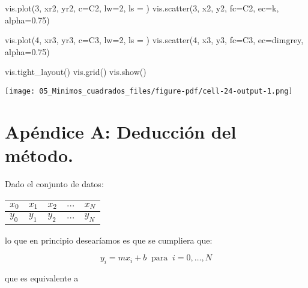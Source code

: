 \documentclass[
  letterpaper,
  DIV=11,
  numbers=noendperiod]{scrreprt}
\newenvironment{Shaded}{\begin{snugshade}}{\end{snugshade}}
\newcommand{\DecValTok}[1]{\textcolor[rgb]{0.68,0.00,0.00}{#1}}
\newcommand{\FloatTok}[1]{\textcolor[rgb]{0.68,0.00,0.00}{#1}}
\newcommand{\NormalTok}[1]{\textcolor[rgb]{0.00,0.23,0.31}{#1}}
\newcommand{\OperatorTok}[1]{\textcolor[rgb]{0.37,0.37,0.37}{#1}}
\newcommand{\StringTok}[1]{\textcolor[rgb]{0.13,0.47,0.30}{#1}}
\begin{document}
\begin{Shaded}
\begin{Highlighting}[]
\NormalTok{vis.plot(}\DecValTok{3}\NormalTok{, xr2, yr2, c}\OperatorTok{=}\StringTok{\textquotesingle{}C2\textquotesingle{}}\NormalTok{, lw}\OperatorTok{=}\DecValTok{2}\NormalTok{, ls }\OperatorTok{=} \StringTok{\textquotesingle{}{-}{-}\textquotesingle{}}\NormalTok{)}
\NormalTok{vis.scatter(}\DecValTok{3}\NormalTok{, x2, y2, fc}\OperatorTok{=}\StringTok{\textquotesingle{}C2\textquotesingle{}}\NormalTok{, ec}\OperatorTok{=}\StringTok{\textquotesingle{}k\textquotesingle{}}\NormalTok{, alpha}\OperatorTok{=}\FloatTok{0.75}\NormalTok{)}

\NormalTok{vis.plot(}\DecValTok{4}\NormalTok{, xr3, yr3, c}\OperatorTok{=}\StringTok{\textquotesingle{}C3\textquotesingle{}}\NormalTok{, lw}\OperatorTok{=}\DecValTok{2}\NormalTok{, ls }\OperatorTok{=} \StringTok{\textquotesingle{}{-}{-}\textquotesingle{}}\NormalTok{)}
\NormalTok{vis.scatter(}\DecValTok{4}\NormalTok{, x3, y3, fc}\OperatorTok{=}\StringTok{\textquotesingle{}C3\textquotesingle{}}\NormalTok{, ec}\OperatorTok{=}\StringTok{\textquotesingle{}dimgrey\textquotesingle{}}\NormalTok{, alpha}\OperatorTok{=}\FloatTok{0.75}\NormalTok{)}

\NormalTok{vis.tight\_layout()}
\NormalTok{vis.grid()}
\NormalTok{vis.show()}
\end{Highlighting}
\end{Shaded}

\texttt{[image: 05\_Minimos\_cuadrados\_files/figure-pdf/cell-24-output-1.png]}


\chapter{Apéndice A: Deducción del
método.}\label{apuxe9ndice-a-deducciuxf3n-del-muxe9todo.}

Dado el conjunto de datos:

\begin{longtable}[]{@{}lllll@{}}
\toprule\noalign{}
\(x_0\) & \(x_1\) & \(x_2\) & \(\dots\) & \(x_N\) \\
\midrule\noalign{}
\endhead
\bottomrule\noalign{}
\endlastfoot
\(y_0\) & \(y_1\) & \(y_2\) & \(\dots\) & \(y_N\) \\
\end{longtable}

lo que en principio desearíamos es que se cumpliera que:

\[y_i = m x_i + b \;\; \text{para} \;\; i = 0, \dots, N \]

que es equivalente a
\end{document}
